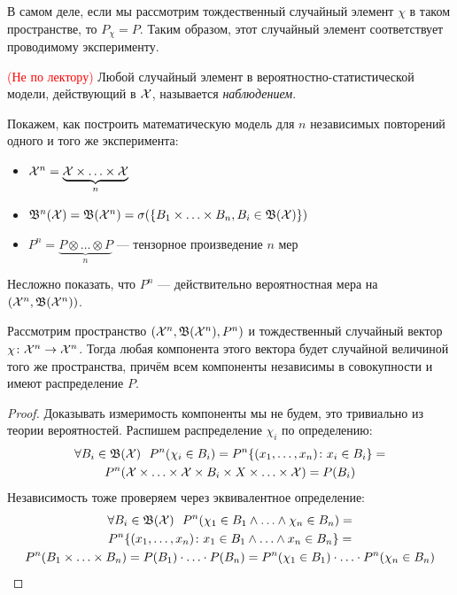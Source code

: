 \begin{note}
	В самом деле, если мы рассмотрим тождественный случайный элемент $\chi$ в таком пространстве, то $P_\chi = P$. Таким образом, этот случайный элемент соответствует проводимому эксперименту.
\end{note}

\begin{definition} \textcolor{red}{(Не по лектору)}
	Любой случайный элемент в вероятностно-статистической модели, действующий в $\mathcal{X}$, называется \textit{наблюдением}.
\end{definition}

\begin{note}
	Покажем, как построить математическую модель для $n$ независимых повторений одного и того же эксперимента:
	\begin{itemize}
		\item $\mathcal{X}^n = \underbrace{\mathcal{X} \times \ldots \times \mathcal{X}}_n$
		
		\item $\mathfrak{B}^n(\mathcal{X}) = \mathfrak{B}(\mathcal{X}^n) = \sigma(\{B_1 \times \ldots \times B_n, B_i \in \mathfrak{B}(\mathcal{X})\})$
		
		\item $P^n = \underbrace{P \otimes \ldots \otimes P}_n$ --- тензорное произведение $n$ мер
	\end{itemize}
	Несложно показать, что $P^n$ --- действительно вероятностная мера на $(\mathcal{X}^n, \mathfrak{B}(\mathcal{X}^n))$.
\end{note}

\begin{proposition}
	Рассмотрим пространство $(\mathcal{X}^n, \mathfrak{B}(\mathcal{X}^n), P^n)$ и тождественный случайный вектор $\chi \colon \mathcal{X}^n \to \mathcal{X}^n$. Тогда любая компонента этого вектора будет случайной величиной того же пространства, причём всем компоненты независимы в совокупности и имеют распределение $P$.
\end{proposition}

\begin{proof}
	Доказывать измеримость компоненты мы не будем, это тривиально из теории вероятностей. Распишем распределение $\chi_i$ по определению:
	\begin{multline*}
		\forall B_i \in \mathfrak{B}(\mathcal{X})\ \ P^n(\chi_i \in B_i) = P^n\{(x_1, \ldots, x_n) \colon x_i \in B_i\} =
		\\
		P^n(\mathcal{X} \times \ldots \times \mathcal{X} \times B_i \times X \times \ldots \times \mathcal{X}) = P(B_i)
	\end{multline*}
	Независимость тоже проверяем через эквивалентное определение:
	\begin{multline*}
		\forall B_i \in \mathfrak{B}(\mathcal{X})\ \ P^n(\chi_1 \in B_1 \wedge \ldots \wedge \chi_n \in B_n) =
		\\
		P^n\{(x_1, \ldots, x_n) \colon x_1 \in B_1 \wedge \ldots \wedge x_n \in B_n\} =
		\\
		P^n(B_1 \times \ldots \times B_n) = P(B_1) \cdot \ldots \cdot P(B_n) = P^n(\chi_1 \in B_1) \cdot \ldots \cdot P^n(\chi_n \in B_n)
	\end{multline*}
\end{proof}

